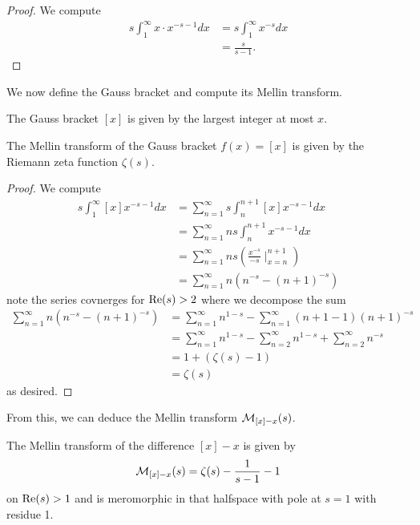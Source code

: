 \begin{proof}
    We compute 
    \begin{align*}
        s\int_{1}^{\infty}x\cdot x^{-s-1}dx &= s\int_{1}^{\infty}x^{-s}dx \\
        &= \frac{s}{s-1}.
    \end{align*}
\end{proof}
We now define the Gauss bracket and compute its Mellin transform. 
\begin{definition}\label{def: Gauss bracket}
    The Gauss bracket $[x]$ is given by the largest integer at most $x$. 
\end{definition}
\begin{lemma}\label{lem: Mellin transform of Gauss bracket}
    The Mellin transform of the Gauss bracket $f(x)=[x]$ is given by the Riemann zeta function $\zeta(s)$. 
\end{lemma}
\begin{proof}
    We compute 
    \begin{align*}
        s\int_{1}^{\infty}[x]x^{-s-1}dx &= \sum_{n=1}^{\infty}s\int_{n}^{n+1}[x]x^{-s-1}dx \\
        &= \sum_{n=1}^{\infty}ns\int_{n}^{n+1}x^{-s-1}dx \\
        &= \sum_{n=1}^{\infty}ns\left(\frac{x^{-s}}{-s}\mid^{n+1}_{x=n}\right) \\
        &= \sum_{n=1}^{\infty}n(n^{-s}-(n+1)^{-s})
    \end{align*}
    note the series covnerges for $\mathrm{Re}(s)>2$ where we decompose the sum 
    \begin{align*}
        \sum_{n=1}^{\infty}n(n^{-s}-(n+1)^{-s}) &= \sum_{n=1}^{\infty}n^{1-s}-\sum_{n=1}^{\infty}(n+1-1)(n+1)^{-s} \\
        &= \sum_{n=1}^{\infty}n^{1-s} - \sum_{n=2}^{\infty}n^{1-s} + \sum_{n=2}^{\infty}n^{-s} \\
        &= 1+(\zeta(s)-1) \\
        &= \zeta(s)
    \end{align*}
    as desired. 
\end{proof}
From this, we can deduce the Mellin transform $\mathcal{M}_{[x]-x}(s)$. 
\begin{proposition}\label{prop: Mellin transform of bracket minus x}
    The Mellin transform of the difference $[x]-x$ is given by 
    $$\mathcal{M}_{[x]-x}(s)=\zeta(s)-\frac{1}{s-1}-1$$
    on $\mathrm{Re}(s)>1$ and is meromorphic in that halfspace with pole at $s=1$ with residue 1.
\end{proposition}
